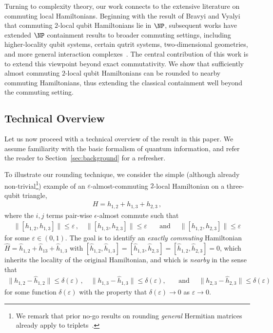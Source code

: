 \documentclass[a4paper,onecolumn,11pt]{quantumarticle}
\theoremstyle{plain}
\newcommand{\eps}{\varepsilon}
\begin{document}
Turning to complexity theory, our work connects to the extensive literature
on commuting local Hamiltonians.  Beginning with the result of Bravyi and
Vyalyi~\cite{bravyi2004commutativeversionklocalhamiltonian} that commuting
$2$-local qubit Hamiltonians lie in $\NP$, subsequent works have extended
$\NP$ containment results to broader commuting settings, including
higher-locality qubit systems, certain qutrit systems, two-dimensional
geometries, and more general interaction complexes~\cite{aharonov2011complexity,schuch2011complexitycommutinghamiltonianssquare,AKV,irani2023commutinglocalhamiltonianproblem,bostanci2025commutinglocalhamiltonians2d}.
The central contribution of this work is to extend this viewpoint beyond
exact commutativity.  We show that sufficiently almost commuting $2$-local
qubit Hamiltonians can be rounded to nearby commuting Hamiltonians, thus
extending the classical containment well beyond the commuting setting.


\subsection{Technical Overview}
Let us now proceed with a technical overview of the result in this paper. We assume familiarity with the basic formalism of quantum information, and refer the reader to Section~\ref{sec:background} for a refresher.

To illustrate our rounding technique, we consider the simple (although already non-trivial\footnote{We remark that prior no-go results on rounding \emph{general} Hermitian matrices already apply to triplets~\cite{Davidson1985}.}) example of an $\eps$-almost-commuting $2$-local Hamiltonian on a three-qubit triangle,
\begin{align}
H = h_{1,2} + h_{1,3} + h_{2,3} \, , 
\end{align}
where the $i,j$ terms pair-wise $\epsilon$-almost commute such that 
\begin{align}
\| [h_{1,2},h_{1,3}]\| \leq \eps \, , \quad \| [h_{1,3},h_{2,3}]\| \leq \eps \quad\,\,\, \text{ and } \quad \| [h_{1,2},h_{2,3}]\| \leq \eps
\end{align}
for some $\eps \in (0,1)$. The goal is to identify an \emph{exactly commuting} Hamiltonian $\hat{H} = \hat h_{1,2} + \hat h_{13} + \hat h_{1,3}$ with $[\hat h_{1,2},\hat h_{1,3}] = [\hat h_{1,3},\hat h_{2,3}] = [\hat h_{1,2},\hat h_{2,3}] = 0$, which inherits the locality of the original Hamiltonian, and which is \emph{nearby} in the sense that
\begin{align}
\| h_{1,2} - \hat h_{1,2}\| \leq \delta(\eps) \, , \quad\| h_{1,3} - \hat h_{1,3}\| \leq \delta(\eps), \quad\,\,\, \text{ and } \quad \| h_{2,3} - \hat h_{2,3}\| \leq \delta(\eps)
\end{align}
for some function $\delta(\eps)$ with the property that $\delta(\eps) \rightarrow 0$ as $\eps \rightarrow 0$.
\end{document}
